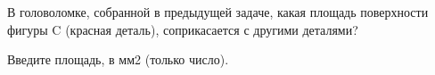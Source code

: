 
В головоломке, собранной в предыдущей задаче, какая площадь поверхности фигуры C (красная деталь), 
соприкасается с другими деталями?


Введите площадь,  в мм2  (только число).